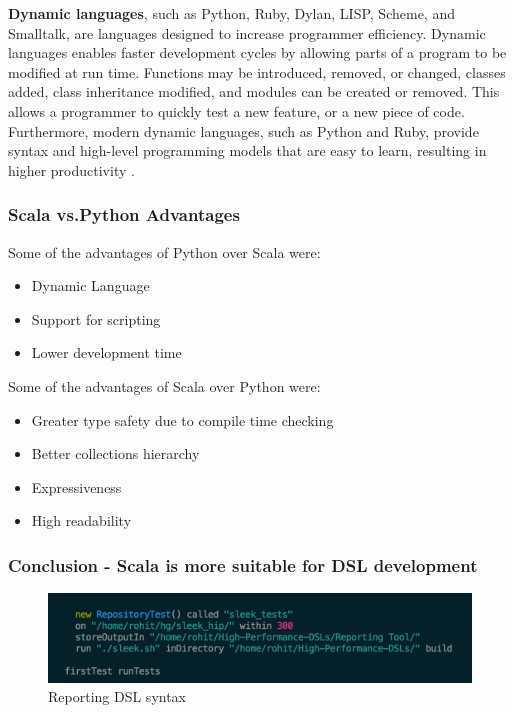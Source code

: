 \noindent
\textbf{Dynamic languages}, such as Python, Ruby, Dylan, LISP, Scheme, and Smalltalk, are languages designed to increase programmer efficiency. Dynamic
languages enables faster development cycles by allowing parts of a program to be modified at run time. Functions may be introduced, removed, or changed, classes added, class inheritance modified, and modules can be created or removed. This allows a programmer to quickly test a new feature, or a new piece of code. Furthermore, modern dynamic languages, such as Python and Ruby, provide syntax and high-level programming models that are easy to learn, resulting in higher productivity \cite{lund}.
\bigskip

\subsubsection{Scala vs.Python Advantages}
\noindent
Some of the advantages of Python over Scala were:
\begin{itemize}
\item Dynamic Language
\item Support for scripting
\item Lower development time
\end{itemize}

\noindent
Some of the advantages of Scala over Python were:
\begin{itemize}
\item Greater type safety due to compile time checking
\item Better collections hierarchy
\item Expressiveness
\item High readability
\end{itemize}

\subsubsection{Conclusion - Scala is more suitable for DSL development}

\begin{figure}[H]
  \centering
    \includegraphics[width=500px]{figures/reportingDSL.png}
  \caption{Reporting DSL syntax}
\end{figure}

